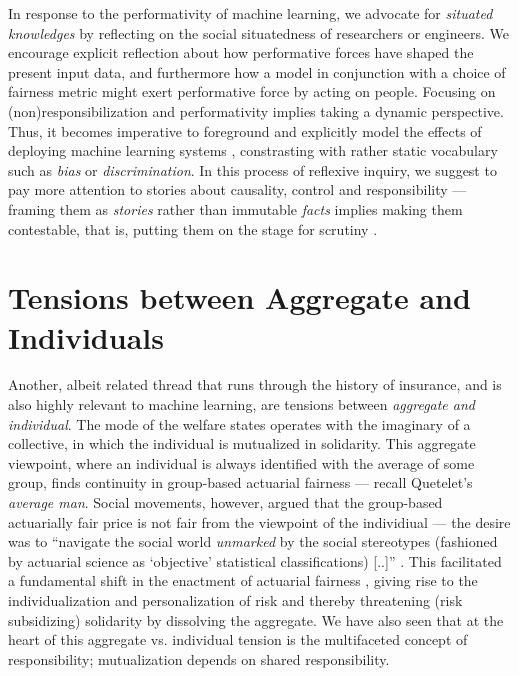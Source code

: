 \documentclass[11pt]{article} %
\makeatletter
\newcommand*{\versus}{vs.\@\xspace}
\makeatother
\begin{document}
In response to the performativity of machine learning, we advocate for \textit{situated knowledges} \citep{haraway1988situated} by reflecting on the social situatedness of researchers or engineers. We encourage explicit reflection about how performative forces have shaped the present input data, and furthermore how a model in conjunction with a choice of fairness metric might exert performative force by acting on people. Focusing on (non)responsibilization and performativity implies taking a dynamic perspective. Thus, it becomes imperative to foreground and explicitly model the effects of deploying machine learning systems
 \citep{hu2018short,liu2018delayed,d2020fairness,schwobel2022long}, constrasting with rather static vocabulary such as \textit{bias} or \textit{discrimination}.
In this process of reflexive inquiry, we suggest to pay more attention to stories about causality, control and responsibility --- framing them as \textit{stories} rather than immutable \textit{facts} implies making them contestable, that is, putting them on the stage for scrutiny \citep{glenn2003postmodernism}. 





\section{Tensions between Aggregate and Individuals}
\label{sec:aggvsind}
Another, albeit related thread that runs through the history of insurance, and is also highly relevant to machine learning, are tensions between \textit{aggregate and individual}. The mode of the welfare states operates with the imaginary of a collective, in which the individual is mutualized in solidarity. This aggregate viewpoint, where an individual is always identified with the average of some group, finds continuity in group-based actuarial fairness \citep{thiery2006fairness} --- recall Quetelet's \textit{average man}. Social movements, however, argued that the group-based actuarially fair price is not fair from the viewpoint of the individiual --- the desire was to ``navigate the social world \textit{unmarked} by the social stereotypes (fashioned by actuarial science as `objective' statistical classifications) [..]'' \citep[emphasis in original]{krippner2023unmasked}. This facilitated a fundamental shift in the enactment of actuarial fairness \citep{meyers2018enacting}, giving rise to the individualization and personalization of risk and thereby threatening (risk subsidizing) solidarity by dissolving the aggregate. We have also seen that at the heart of this aggregate \versus individual tension is the multifaceted concept of responsibility; mutualization depends on shared responsibility.
\end{document}
